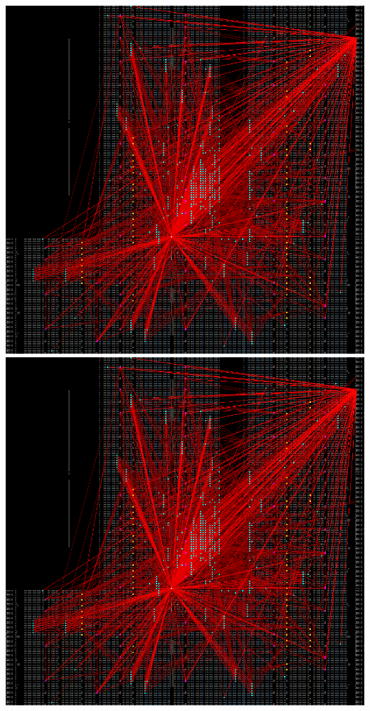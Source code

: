 {    \includegraphics[valign=t, scale=0.13]{figures/results/PlacerGreedyMidpoint/00000100.png}
    \includegraphics[valign=t, scale=0.13]{figures/results/PlacerGreedyMidpoint/00000299.png}
    \label{fig:PGMSnapshots}
}

